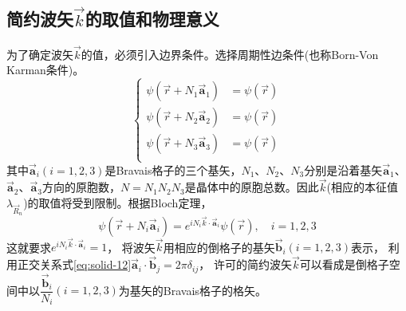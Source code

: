 \subsection{简约波矢$\vec k$的取值和物理意义}
为了确定波矢$\vec k$的值，必须引入边界条件。选择周期性边条件(也称Born-Von Karman条件)。
\begin{equation}
  \left\{
  \begin{aligned}
     \psi(\vec r+N_1\vec{\mathbf a}_1)&=\psi(\vec r)\\
     \psi(\vec r+N_2\vec{\mathbf a}_2)&=\psi(\vec r)\\
     \psi(\vec r+N_3\vec{\mathbf a}_3)&=\psi(\vec r)\\
   \end{aligned}\right.
  \label{eq:solid-31}
\end{equation}
其中$\vec{\mathbf a}_i(i=1,2,3)$是Bravais格子的三个基矢，$N_1$、$N_2$、$N_3$分别是沿着基矢$\vec{\mathbf a}_1$、$\vec{\mathbf a}_2$、$\vec{\mathbf a}_3$方向的原胞数，$N=N_1N_2N_3$是晶体中的原胞总数。因此$\vec k$(相应的本征值$\lambda_{\vec R_n}$)的取值将受到限制。根据Bloch定理，%
\begin{equation}
  \psi(\vec r+N_i\vec{\mathbf a}_i)=e^{iN_i\vec k\cdot\vec{\mathbf a}_i}\psi(\vec r),\quad i=1,2,3
  \label{eq:solid-32}
\end{equation}
这就要求$e^{iN_i\vec k\cdot\vec{\mathbf a}_i}=1$，
将波矢$\vec k$用相应的倒格子的基矢$\vec{\mathbf b}_i(i=1,2,3)$表示，%
利用正交关系式\eqref{eq:solid-12}$\vec{\mathbf a}_i\cdot\vec{\mathbf b}_j=2\pi\delta_{ij}$，%
许可的简约波矢$\vec k$可以看成是倒格子空间中以$\dfrac{\vec{\mathbf b}_i}{N_i}(i=1,2,3)$为基矢的Bravais格子的格矢。



